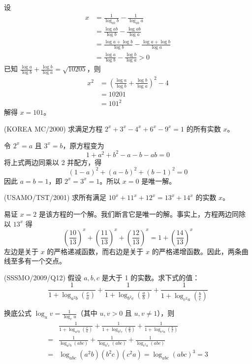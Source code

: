 \begin{questions}
\begin{solution}
设
\begin{align*}
x &= \frac{1}{\log_{ab} b} - \frac{1}{\log_{ab} a} \\
&= \frac{\log ab}{\log b} - \frac{\log ab}{\log a} \\
&= \frac{\log a + \log b}{\log b} - \frac{\log a + \log b}{\log a} \\
&= \frac{\log a}{\log b} - \frac{\log b}{\log a} > 0
\end{align*}
已知 $\frac{\log a}{\log b} + \frac{\log b}{\log a} = \sqrt{10205}$，则
\begin{align*}
x^2 &= \left( \frac{\log a}{\log b} + \frac{\log b}{\log a} \right)^2 - 4 \\
&= 10201 \\
&= 101^2
\end{align*}
解得 $x = 101$。
\end{solution}

\question
(KOREA MC/2000) 求满足方程 $2^x+3^x-4^x+6^x-9^x=1$ 的所有实数 $x$。
\begin{solution}
令 $2^x=a$ 且 $3^x=b$，原方程变为
\[
1+a^2+b^2-a-b-ab=0
\]
将上式两边同乘以 2 并配方，得
\[
(1-a)^2+(a-b)^2+(b-1)^2=0
\]
因此 $a=b=1$，即 $2^x=3^x=1$。所以 $x=0$ 是唯一解。
\end{solution}

\question
(USAMO/TST/2001) 求所有满足 $10^x+11^x+12^x=13^x+14^x$ 的实数 $x$。
\begin{solution}
易证 $x=2$ 是该方程的一个解。我们断言它是唯一的解。事实上，方程两边同除以 $13^x$ 得
\[
\left(\frac{10}{13}\right)^x+\left(\frac{11}{13}\right)^x+\left(\frac{12}{13}\right)^x=1+\left(\frac{14}{13}\right)^x
\]
左边是关于 $x$ 的严格递减函数，而右边是关于 $x$ 的严格递增函数。因此，两条曲线至多有一个交点。
\end{solution}

\question
(SSSMO/2009/Q12) 假设 $a, b, c$ 是大于 1 的实数。求下式的值：
\[
\frac{1}{1+\log_{a^2 b}\left(\frac{c}{a}\right)}+\frac{1}{1+\log_{b^2 c}\left(\frac{a}{b}\right)}+\frac{1}{1+\log_{c^2 a}\left(\frac{b}{c}\right)}
\]
\begin{solution}
换底公式 $\log_u v = \frac{1}{\log_v u}$（其中 $u, v > 0$ 且 $u, v \ne 1$），则
\begin{align*}
&\frac{1}{1+\log_{a^2 b}\left(\frac{c}{a}\right)}+\frac{1}{1+\log_{b^2 c}\left(\frac{a}{b}\right)}+\frac{1}{1+\log_{c^2 a}\left(\frac{b}{c}\right)} \\
=& \frac{1}{\log_{a^2 b}(abc)}+\frac{1}{\log_{b^2 c}(abc)}+\frac{1}{\log_{c^2 a}(abc)} \\
=& \log_{abc}\left(a^2 b\right)\left(b^2 c\right)\left(c^2 a\right) = \log_{abc}(abc)^3 = 3
\end{align*}
\end{solution}


\end{questions}

